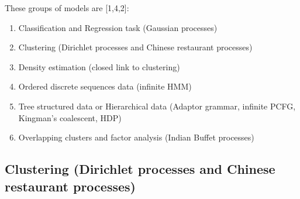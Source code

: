 These groups of models are [1,4,2]:
\begin{enumerate}
  \item Classification and Regression task (Gaussian processes)
\item Clustering (Dirichlet processes and Chinese restaurant processes)
\item Density estimation (closed link to clustering)
\item Ordered discrete sequences data (infinite HMM)
\item Tree structured data or Hierarchical data (Adaptor grammar, infinite PCFG,
Kingman’s coalescent, HDP)
\item Overlapping clusters and factor analysis (Indian Buffet processes)
\end{enumerate}

\subsection{Clustering (Dirichlet processes and Chinese restaurant processes)}
\label{ssec:bnp-chinese}

\fi

    